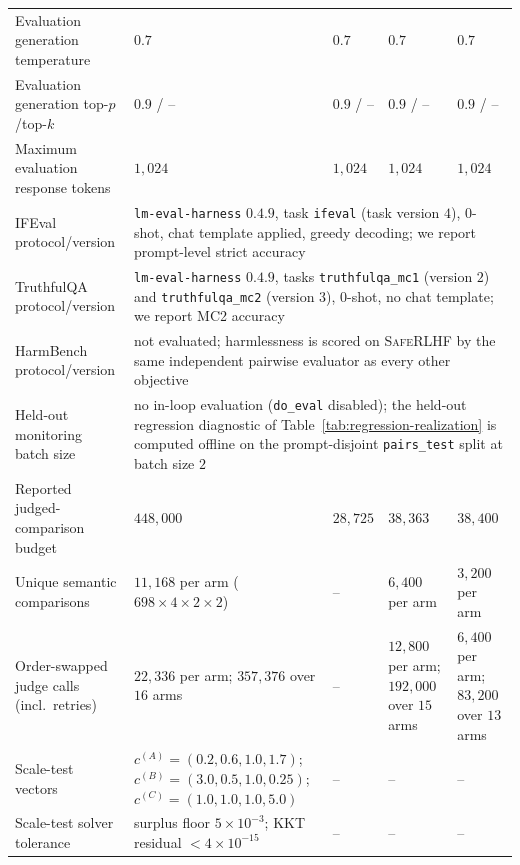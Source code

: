 \documentclass{article}
\theoremstyle{remark}
\theoremstyle{plain}
\begin{document}
\begin{table}[t]
\begin{tabular}{@{}p{}p{}p{}p{}p{}@{}}
Evaluation generation temperature & $0.7$ & $0.7$ & $0.7$ & $0.7$ \\
Evaluation generation top-$p$/top-$k$ & $0.9$ / -- & $0.9$ / -- & $0.9$ / -- & $0.9$ / -- \\
Maximum evaluation response tokens & $1{,}024$ & $1{,}024$ & $1{,}024$ & $1{,}024$ \\
IFEval protocol/version & \multicolumn{4}{p{0.695\textwidth}}{\texttt{lm-eval-harness} $0.4.9$, task \texttt{ifeval} (task version $4$), $0$-shot, chat template applied, greedy decoding; we report prompt-level strict accuracy} \\
TruthfulQA protocol/version & \multicolumn{4}{p{0.695\textwidth}}{\texttt{lm-eval-harness} $0.4.9$, tasks \texttt{truthfulqa\_mc1} (version $2$) and \texttt{truthfulqa\_mc2} (version $3$), $0$-shot, no chat template; we report MC2 accuracy} \\
HarmBench protocol/version & \multicolumn{4}{p{0.695\textwidth}}{not evaluated; harmlessness is scored on \textsc{SafeRLHF} by the same independent pairwise evaluator as every other objective} \\
Held-out monitoring batch size & \multicolumn{4}{p{0.695\textwidth}}{no in-loop evaluation (\texttt{do\_eval} disabled); the held-out regression diagnostic of Table~\ref{tab:regression-realization} is computed offline on the prompt-disjoint \texttt{pairs\_test} split at batch size $2$} \\
Reported judged-comparison budget & $448{,}000$ & $28{,}725$ & $38{,}363$ & $38{,}400$ \\
Unique semantic comparisons & $11{,}168$ per arm ($698\times4\times2\times2$) & -- & $6{,}400$ per arm & $3{,}200$ per arm\\
Order-swapped judge calls (incl.\ retries) & $22{,}336$ per arm; $357{,}376$ over $16$ arms & -- & $12{,}800$ per arm; $192{,}000$ over $15$ arms & $6{,}400$ per arm; $83{,}200$ over $13$ arms\\
Scale-test vectors & $c^{(A)}=(0.2,0.6,1.0,1.7)$; $c^{(B)}=(3.0,0.5,1.0,0.25)$; $c^{(C)}=(1.0,1.0,1.0,5.0)$ & -- & -- & -- \\
Scale-test solver tolerance & surplus floor $5\times10^{-3}$; KKT residual $<4\times10^{-15}$ & -- & -- & -- \\
\bottomrule
\end{tabular}
\end{table}
\end{document}
